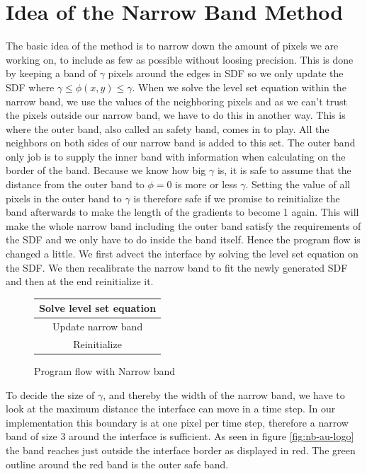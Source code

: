 \section{Idea of the Narrow Band Method}
The basic idea of the method is to narrow down the amount of pixels we
are working on, to include as few as possible without loosing
precision. This is done by keeping a band of $\gamma$ pixels around
the edges in SDF so we only update the SDF where
$\gamma \leq \phi(x,y) \leq \gamma$. When we solve the level set
equation within the narrow band, we use the values of the neighboring
pixels and as we can't trust the pixels outside our narrow band, we
have to do this in another way. This is where the outer band, also
called an safety band, comes in to play. All the neighbors on both
sides of our narrow band is added to this set. The outer band only job
is to supply the inner band with information when calculating on the
border of the band. Because we know how big $\gamma$ is, it is safe to
assume that the distance from the outer band to $\phi=0$ is more or
less $\gamma$. Setting the value of all pixels in the outer band to
$\gamma$ is therefore safe if we promise to reinitialize the band
afterwards to make the length of the gradients to become 1 again. This
will make the whole narrow band including the outer band satisfy the
requirements of the SDF and we only have to do inside the band
itself. Hence the program flow is changed a little. We first advect
the interface by solving the level set equation on the SDF. We then
recalibrate the narrow band to fit the newly generated SDF and
then at the end reinitialize it.


\begin{figure}[!ht]
  \centering
  \begin{tabular}{ | c | }
   \hline			
   Solve level set equation \\
   \hline
   Update narrow band \\
   \hline   
   Reinitialize \\
   \hline  
  \end{tabular}
  \caption{Program flow with Narrow band}
  \label{fig:narrowband_flow}
\end{figure}


To decide the size of $\gamma$, and thereby the width of the narrow
band, we have to look at the maximum distance the interface can move
in a time step. In our implementation this boundary is at one pixel
per time step, therefore a narrow band of size 3 around the interface
is sufficient. As seen in figure \vref{fig:nb-au-logo} the band
reaches just outside the interface border as displayed in red. The
green outline around the red band is the outer safe band.

